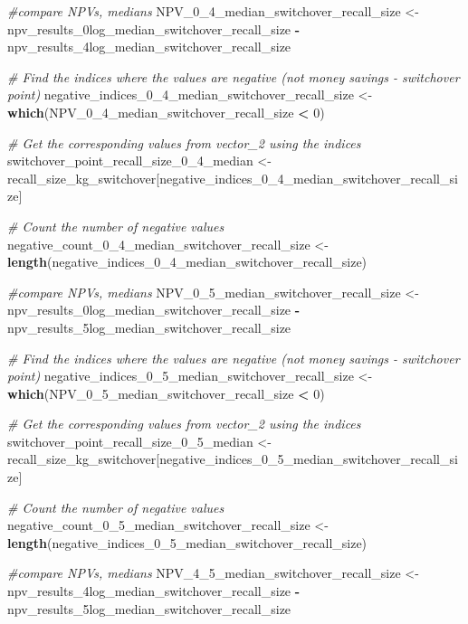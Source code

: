 \documentclass[
]{article}
\newenvironment{Shaded}{\begin{snugshade}}{\end{snugshade}}
\newcommand{\CommentTok}[1]{\textcolor[rgb]{0.56,0.35,0.01}{\textit{#1}}}
\newcommand{\DecValTok}[1]{\textcolor[rgb]{0.00,0.00,0.81}{#1}}
\newcommand{\FunctionTok}[1]{\textcolor[rgb]{0.13,0.29,0.53}{\textbf{#1}}}
\newcommand{\NormalTok}[1]{#1}
\newcommand{\OtherTok}[1]{\textcolor[rgb]{0.56,0.35,0.01}{#1}}
\newcommand{\SpecialCharTok}[1]{\textcolor[rgb]{0.81,0.36,0.00}{\textbf{#1}}}
\begin{document}
\begin{Shaded}
\begin{Highlighting}[]
\CommentTok{\#compare NPVs, medians}
\NormalTok{NPV\_0\_4\_median\_switchover\_recall\_size }\OtherTok{\textless{}{-}}\NormalTok{ npv\_results\_0log\_median\_switchover\_recall\_size }\SpecialCharTok{{-}}\NormalTok{ npv\_results\_4log\_median\_switchover\_recall\_size}

\CommentTok{\# Find the indices where the values are negative (not money savings {-} switchover point)}
\NormalTok{negative\_indices\_0\_4\_median\_switchover\_recall\_size }\OtherTok{\textless{}{-}} \FunctionTok{which}\NormalTok{(NPV\_0\_4\_median\_switchover\_recall\_size }\SpecialCharTok{\textless{}} \DecValTok{0}\NormalTok{)}

\CommentTok{\# Get the corresponding values from vector\_2 using the indices}
\NormalTok{switchover\_point\_recall\_size\_0\_4\_median }\OtherTok{\textless{}{-}}\NormalTok{ recall\_size\_kg\_switchover[negative\_indices\_0\_4\_median\_switchover\_recall\_size]}

\CommentTok{\# Count the number of negative values}
\NormalTok{negative\_count\_0\_4\_median\_switchover\_recall\_size }\OtherTok{\textless{}{-}} \FunctionTok{length}\NormalTok{(negative\_indices\_0\_4\_median\_switchover\_recall\_size)}


\CommentTok{\#compare NPVs, medians}
\NormalTok{NPV\_0\_5\_median\_switchover\_recall\_size }\OtherTok{\textless{}{-}}\NormalTok{ npv\_results\_0log\_median\_switchover\_recall\_size }\SpecialCharTok{{-}}\NormalTok{ npv\_results\_5log\_median\_switchover\_recall\_size}

\CommentTok{\# Find the indices where the values are negative (not money savings {-} switchover point)}
\NormalTok{negative\_indices\_0\_5\_median\_switchover\_recall\_size }\OtherTok{\textless{}{-}} \FunctionTok{which}\NormalTok{(NPV\_0\_5\_median\_switchover\_recall\_size }\SpecialCharTok{\textless{}} \DecValTok{0}\NormalTok{)}

\CommentTok{\# Get the corresponding values from vector\_2 using the indices}
\NormalTok{switchover\_point\_recall\_size\_0\_5\_median }\OtherTok{\textless{}{-}}\NormalTok{ recall\_size\_kg\_switchover[negative\_indices\_0\_5\_median\_switchover\_recall\_size]}

\CommentTok{\# Count the number of negative values}
\NormalTok{negative\_count\_0\_5\_median\_switchover\_recall\_size }\OtherTok{\textless{}{-}} \FunctionTok{length}\NormalTok{(negative\_indices\_0\_5\_median\_switchover\_recall\_size)}


\CommentTok{\#compare NPVs, medians}
\NormalTok{NPV\_4\_5\_median\_switchover\_recall\_size }\OtherTok{\textless{}{-}}\NormalTok{ npv\_results\_4log\_median\_switchover\_recall\_size }\SpecialCharTok{{-}}\NormalTok{ npv\_results\_5log\_median\_switchover\_recall\_size}


\end{Highlighting}
\end{Shaded}
\end{document}
